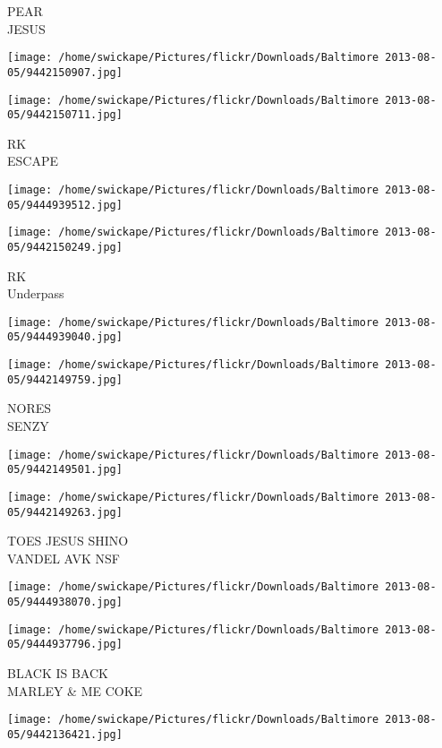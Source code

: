 \documentclass[10pt,letterpaper]{article}
\begin{document}
PEAR\\
JESUS
\pagebreak

\texttt{[image: /home/swickape/Pictures/flickr/Downloads/Baltimore 2013-08-05/9442150907.jpg]}

\vspace{0.25in}
\texttt{[image: /home/swickape/Pictures/flickr/Downloads/Baltimore 2013-08-05/9442150711.jpg]}

RK\\
ESCAPE
\pagebreak

\texttt{[image: /home/swickape/Pictures/flickr/Downloads/Baltimore 2013-08-05/9444939512.jpg]}

\vspace{0.25in}
\texttt{[image: /home/swickape/Pictures/flickr/Downloads/Baltimore 2013-08-05/9442150249.jpg]}

RK\\
Underpass
\pagebreak

\texttt{[image: /home/swickape/Pictures/flickr/Downloads/Baltimore 2013-08-05/9444939040.jpg]}

\vspace{0.25in}
\texttt{[image: /home/swickape/Pictures/flickr/Downloads/Baltimore 2013-08-05/9442149759.jpg]}

NORES\\
SENZY
\pagebreak

\texttt{[image: /home/swickape/Pictures/flickr/Downloads/Baltimore 2013-08-05/9442149501.jpg]}

\vspace{0.25in}
\texttt{[image: /home/swickape/Pictures/flickr/Downloads/Baltimore 2013-08-05/9442149263.jpg]}

TOES JESUS SHINO\\
VANDEL AVK NSF
\pagebreak

\texttt{[image: /home/swickape/Pictures/flickr/Downloads/Baltimore 2013-08-05/9444938070.jpg]}

\vspace{0.25in}
\texttt{[image: /home/swickape/Pictures/flickr/Downloads/Baltimore 2013-08-05/9444937796.jpg]}

BLACK IS BACK\\
MARLEY \& ME COKE
\pagebreak

\texttt{[image: /home/swickape/Pictures/flickr/Downloads/Baltimore 2013-08-05/9442136421.jpg]}
\end{document}
